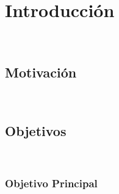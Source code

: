 %





\rehead{\mytitle}
\lohead{\leftmark}
\chapter{Introducción}~\hypertarget{ch:chapter_01}{}
\label{ch:chapter_01}

\lipsum[1-2]



\section{Motivación}~\hypertarget{sec:sec110}{}
\label{sec:sec110}


\bigskip


\section{Objetivos}~\hypertarget{sec:sec120}{}
\label{sec:sec120}

\bigskip

\subsection{Objetivo Principal}~\hypertarget{sec:sec121}{}
\label{sec:sec121}


